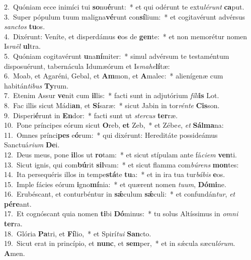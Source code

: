 {2.~}Quóniam ecce inimíci tui \textbf{so}nu\textbf{é}runt:~* et qui odérunt te extu\textit{lé}\textit{runt} \textbf{ca}put.\\
{3.~}Super pópulum tuum maligna\textbf{vé}runt con\textbf{sí}lium:~* et cogitavérunt advérsus \textit{san}\textit{ctos} \textbf{tu}os.\\
{4.~}Dixérunt: Veníte, et disperdámus \textbf{e}os de \textbf{gen}te:~* et non memorétur nomen Is\textit{ra}\textit{ël} \textbf{ul}tra.\\
{5.~}Quóniam cogitavérunt \textbf{u}na\textbf{ní}miter:~* simul advérsum te testaméntum disposuérunt, tabernácula Idumæórum et Is\textit{ma}\textit{he}\textbf{lí}tæ:\\
{6.~}Moab, et Agaréni, Gebal, et \textbf{Am}mon, et \textbf{A}malec:~* alienígenæ cum habitán\textit{ti}\textit{bus} \textbf{Ty}rum.\\
{7.~}Etenim Assur \textbf{ve}nit cum \textbf{il}lis:~* facti sunt in adjutórium \textit{fí}\textit{li}\textbf{is} Lot.\\
{8.~}Fac illis sicut Mádi\textbf{an}, et \textbf{Sí}saræ:~* sicut Jabin in tor\textit{rén}\textit{te} \textbf{Cis}son.\\
{9.~}Disperi\textbf{é}runt in \textbf{En}dor:~* facti sunt ut \textit{ster}\textit{cus} \textbf{ter}ræ.\\
{10.~}Pone príncipes eórum sicut \textbf{O}reb, \textbf{et} Zeb,~* et Zébe\textit{e}, \textit{et} \textbf{Sál}\textbf{ma}na:\\
{11.~}Omnes prínci\textbf{pes} e\textbf{ó}rum:~* qui dixérunt: Hereditáte possideámus Sanctuá\textit{ri}\textit{um} \textbf{De}i.\\
{12.~}Deus meus, pone \textbf{il}los ut \textbf{ro}tam:~* et sicut stípulam ante fá\textit{ci}\textit{em} \textbf{ven}ti.\\
{13.~}Sicut ignis, qui com\textbf{bú}rit \textbf{sil}vam:~* et sicut flamma com\textit{bú}\textit{rens} \textbf{mon}tes:\\
{14.~}Ita persequéris illos in tempe\textbf{stá}te \textbf{tu}a:~* et in ira tua tur\textit{bá}\textit{bis} \textbf{e}os.\\
{15.~}Imple fácies eórum \textbf{i}gno\textbf{mí}nia:~* et quærent nomen \textit{tu}\textit{um}, \textbf{Dó}\textbf{mi}ne.\\
{16.~}Erubéscant, et conturbéntur in \textbf{sǽ}culum \textbf{sǽ}culi:~* et confundán\textit{tur}, \textit{et} \textbf{pé}\textbf{re}ant.\\
{17.~}Et cognóscant quia nomen \textbf{ti}bi \textbf{Dó}minus:~* tu solus Altíssimus in \textit{om}\textit{ni} \textbf{ter}ra.\\
{18.~}Glória \textbf{Pa}tri, et \textbf{Fí}lio,~* et Spirí\textit{tu}\textit{i} \textbf{San}cto.\\
{19.~}Sicut erat in princípio, et \textbf{nunc}, et \textbf{sem}per,~* et in sǽcula sæcu\textit{ló}\textit{rum}. \textbf{A}men.\\

